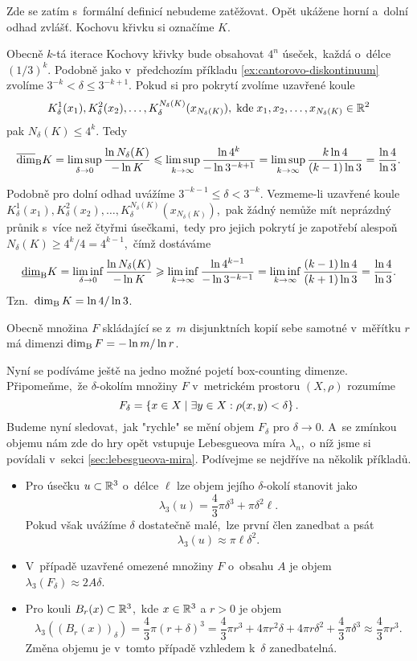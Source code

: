 \begin{example}\label{ex:kochova-krivka}
    Zde se zatím s~formální definicí nebudeme zatěžovat. Opět ukážene horní a~dolní odhad zvlášť. Kochovu křivku si označíme $K$.

    Obecně $k$-tá iterace Kochovy křivky bude obsahovat $4^n$ úseček,~každá o~délce $(1/3)^k$. Podobně jako v~předchozím příkladu \ref{ex:cantorovo-diskontinuum} zvolíme $3^{-k}<\delta\leqslant 3^{-k+1}$. Pokud si pro pokrytí zvolíme uzavřené koule
    \[K_\delta^1(x_1),K_\delta^2(x_2),\ldots,K_\delta^{N_\delta(K)}(x_{N_\delta(K)}),\;\text{kde}\;x_1,x_2,\ldots,x_{N_\delta(K)}\in\mathbb{R}^2\]
    pak $N_\delta(K)\leqslant 4^k$. Tedy
    \[\overline{\dim}_\textup{B}{K}=\limsup_{\delta\to 0}\dfrac{\ln{N_\delta(K)}}{-\ln{K}}\leqslant\limsup_{k\to\infty}\dfrac{\ln{4^k}}{-\ln{3^{-k+1}}}=\limsup_{k\to\infty}\dfrac{k\ln{4}}{(k-1)\ln{3}}=\dfrac{\ln{4}}{\ln{3}}.\]

    Podobně pro dolní odhad uvážíme $3^{-k-1}\leqslant\delta<3^{-k}$. Vezmeme-li uzavřené koule $K_\delta^1(x_1),K_\delta^2(x_2),\ldots,K_\delta^{N_\delta(K)}(x_{N_\delta(K)})$,~pak žádný nemůže mít neprázdný průnik s~více než čtyřmi úsečkami,~tedy pro jejich pokrytí je zapotřebí alespoň $N_\delta(K)\geqslant 4^k/4=4^{k-1}$,~čímž dostáváme
    \[\underline{\dim}_\textup{B}{K}=\liminf_{\delta\to 0}\dfrac{\ln{N_\delta(K)}}{-\ln{K}}\geqslant\liminf_{k\to\infty}\dfrac{\ln{4^{k-1}}}{-\ln{3^{-k-1}}}=\liminf_{k\to\infty}\dfrac{(k-1)\ln{4}}{(k+1)\ln{3}}=\dfrac{\ln{4}}{\ln{3}}.\]
    Tzn.~$\operatorname{dim_B}{K}=\ln{4}/\ln{3}$.
\end{example}
\begin{remark}
    Obecně množina $F$ skládající se z~$m$ disjunktních kopií sebe samotné v~měřítku $r$ má dimenzi $\operatorname{dim_B}{F}=-\ln{m}/\ln{r}$.
\end{remark}
Nyní se podíváme ještě na jedno možné pojetí box-counting dimenze. Připomeňme,~že $\delta$-okolím množiny $F$ v~metrickém prostoru $(X,\rho)$ rozumíme
\[F_\delta=\left\{x\in X\mid\exists y\in X: \rho(x,y)<\delta\right\}.\]
Budeme nyní sledovat,~jak "rychle" se mění objem $F_\delta$ pro $\delta\to 0$. A~se zmínkou objemu nám zde do hry opět vstupuje Lebesgueova míra $\lambda_n$,~o níž jsme si povídali v~sekci \ref{sec:lebesgueova-mira}. Podívejme se nejdříve na několik příkladů.
\begin{itemize}
    \item Pro úsečku $u\subset\mathbb{R}^3$ o~délce $\ell$ lze objem jejího $\delta$-okolí stanovit jako
    \[\lambda_3(u)=\dfrac{4}{3}\pi \delta^3+\pi\delta^2\ell.\]
    Pokud však uvážíme $\delta$ dostatečně malé,~lze první člen zanedbat a psát
    \[\lambda_3(u)\approx\pi\ell\delta^2.\]
    \item V~případě uzavřené omezené množiny $F$ o~obsahu $A$ je objem $\lambda_3(F_\delta)\approx 2A\delta$.
    \item Pro kouli $B_r(x)\subset\mathbb{R}^3$,~kde $x\in\mathbb{R}^3$ a $r>0$ je objem
    \[\lambda_3((B_r(x))_\delta)=\dfrac{4}{3}\pi (r+\delta)^3=\dfrac{4}{3}\pi r^3+4\pi r^2\delta+4\pi r\delta^2+\dfrac{4}{3}\pi\delta^3\approx\dfrac{4}{3}\pi r^3.\]
    Změna objemu je v~tomto případě vzhledem k~$\delta$ zanedbatelná.
\end{itemize}
